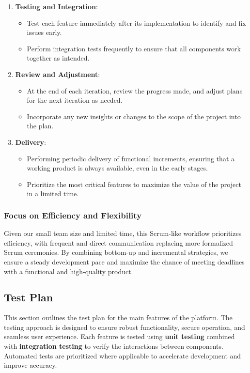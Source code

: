 \begin{enumerate}
        \item \textbf{Testing and Integration}:
        \begin{itemize}
            \item Test each feature immediately after its implementation to identify and fix issues early.
            \item Perform integration tests frequently to ensure that all components work together as intended.
        \end{itemize}

        \item \textbf{Review and Adjustment}:
        \begin{itemize}
            \item At the end of each iteration, review the progress made, and adjust plans for the next iteration as needed.
            \item Incorporate any new insights or changes to the scope of the project into the plan.
        \end{itemize}

        \item \textbf{Delivery}:
        \begin{itemize}
            \item Performing periodic delivery of functional increments, ensuring that a working product is always available, even in the early stages.
            \item Prioritize the most critical features to maximize the value of the project in a limited time.
        \end{itemize}
    \end{enumerate}

    \subsubsection{Focus on Efficiency and Flexibility}
    Given our small team size and limited time, this Scrum-like workflow prioritizes efficiency, with frequent and direct communication replacing more formalized Scrum ceremonies. By combining bottom-up and incremental strategies, we ensure a steady development pace and maximize the chance of meeting deadlines with a functional and high-quality product.

\subsection{Test Plan}
This section outlines the test plan for the main features of the platform. The testing approach is designed to ensure robust functionality, secure operation, and seamless user experience. Each feature is tested using \textbf{unit testing} combined with \textbf{integration testing} to verify the interactions between components. Automated tests are prioritized where applicable to accelerate development and improve accuracy.

